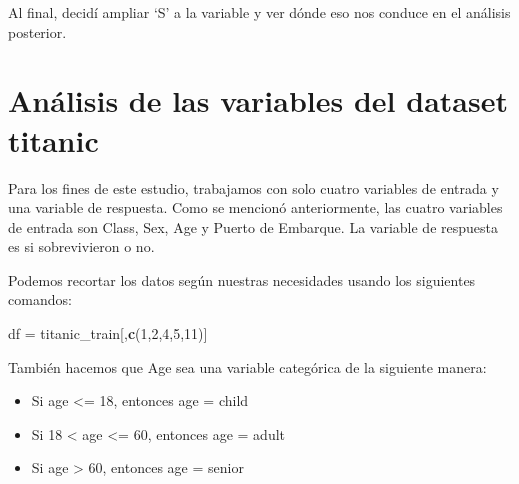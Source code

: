 \documentclass[]{article}
\newenvironment{Shaded}{\begin{snugshade}}{\end{snugshade}}
\newcommand{\KeywordTok}[1]{\textcolor[rgb]{0.13,0.29,0.53}{\textbf{#1}}}
\newcommand{\DecValTok}[1]{\textcolor[rgb]{0.00,0.00,0.81}{#1}}
\newcommand{\StringTok}[1]{\textcolor[rgb]{0.31,0.60,0.02}{#1}}
\newcommand{\OperatorTok}[1]{\textcolor[rgb]{0.81,0.36,0.00}{\textbf{#1}}}
\newcommand{\NormalTok}[1]{#1}
\providecommand{\tightlist}{%
  \setlength{\itemsep}{0pt}\setlength{\parskip}{0pt}}
\begin{document}
Al final, decidí ampliar `S' a la variable y ver dónde eso nos conduce
en el análisis posterior.

\begin{Shaded}
\end{Shaded}

\section{Análisis de las variables del dataset
titanic}\label{analisis-de-las-variables-del-dataset-titanic}

Para los fines de este estudio, trabajamos con solo cuatro variables de
entrada y una variable de respuesta. Como se mencionó anteriormente, las
cuatro variables de entrada son Class, Sex, Age y Puerto de Embarque. La
variable de respuesta es si sobrevivieron o no.

Podemos recortar los datos según nuestras necesidades usando los
siguientes comandos:

\begin{Shaded}
\begin{Highlighting}[]
\NormalTok{df =}\StringTok{ }\NormalTok{titanic_train[,}\KeywordTok{c}\NormalTok{(}\DecValTok{1}\NormalTok{,}\DecValTok{2}\NormalTok{,}\DecValTok{4}\NormalTok{,}\DecValTok{5}\NormalTok{,}\DecValTok{11}\NormalTok{)]}
\end{Highlighting}
\end{Shaded}

También hacemos que Age sea una variable categórica de la siguiente
manera:

\begin{itemize}
\tightlist
\item
  Si age \textless{}= 18, entonces age = child
\item
  Si 18 \textless{} age \textless{}= 60, entonces age = adult
\item
  Si age \textgreater{} 60, entonces age = senior
\end{itemize}
\end{document}
